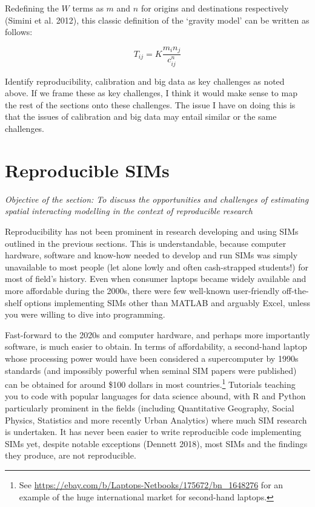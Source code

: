\documentclass[11pt,letterpaper]{article}
\begin{document}
Redefining the \(W\) terms as \(m\) and \(n\) for origins and destinations respectively (Simini et al. 2012), this classic definition of the `gravity model' can be written as follows:

\[
T_{i j}=K \frac{m_{i} n_{j}}{c_{i j}^{n}}
\]

Identify reproducibility, calibration and big data as key challenges as noted above.
If we frame these as key challenges, I think it would make sense to map the rest of the sections onto these challenges.
The issue I have on doing this is that the issues of calibration and big data may entail similar or the same challenges.

\hypertarget{reproducible-sims}{%
\section{\texorpdfstring{Reproducible SIMs }{Reproducible SIMs }}\label{reproducible-sims}}

\emph{Objective of the section: To discuss the opportunities and challenges of estimating spatial interacting modelling in the context of reproducible research}

Reproducibility has not been prominent in research developing and using SIMs outlined in the previous sections.
This is understandable, because computer hardware, software and know-how needed to develop and run SIMs was simply unavailable to most people (let alone lowly and often cash-strapped students!) for most of field's history.
Even when consumer laptops became widely available and more affordable during the 2000s, there were few well-known user-friendly off-the-shelf options implementing SIMs other than MATLAB and arguably Excel, unless you were willing to dive into programming.

Fast-forward to the 2020s and computer hardware, and perhaps more importantly software, is much easier to obtain.
In terms of affordability, a second-hand laptop whose processing power would have been considered a supercomputer by 1990s standards (and impossibly powerful when seminal SIM papers were published) can be obtained for around \$100 dollars in most countries.\footnote{See \url{https://ebay.com/b/Laptops-Netbooks/175672/bn_1648276} for an example of the huge international market for second-hand laptops.}
Tutorials teaching you to code with popular languages for data science abound, with R and Python particularly prominent in the fields (including Quantitative Geography, Social Physics, Statistics and more recently Urban Analytics) where much SIM research is undertaken.
It has never been easier to write reproducible code implementing SIMs yet, despite notable exceptions (Dennett 2018), most SIMs and the findings they produce, are not reproducible.
\end{document}
